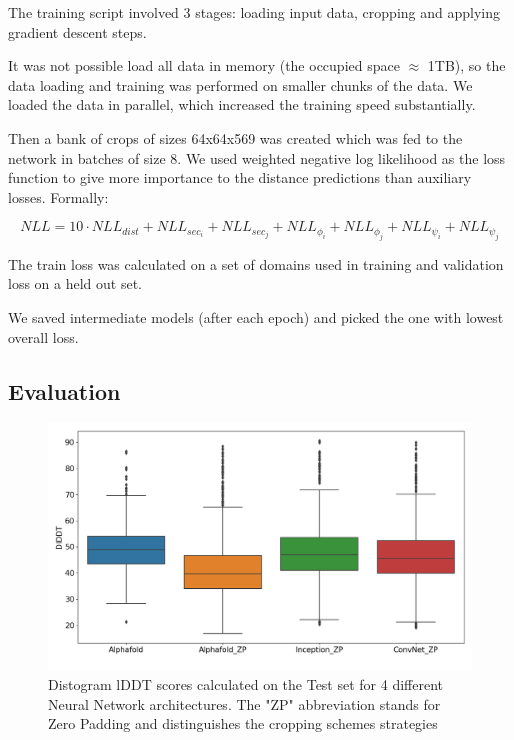 The training script involved 3 stages: loading input data, cropping and applying gradient descent steps.

It was not possible load all data in memory (the occupied space $\approx$ 1TB), so the data loading and training was performed on smaller chunks of the data. We loaded the data in parallel, which increased the training speed substantially.

Then a bank of crops of sizes 64x64x569 was created which was fed to the network in batches of size 8. We used weighted negative log likelihood as the loss function to give more importance to the distance predictions than auxiliary losses. Formally:

\begin{equation}
    NLL = 10 \cdot NLL_{dist} + NLL_{sec_i} + NLL_{sec_j} + NLL_{\phi_i} + NLL_{\phi_j} + NLL_{\psi_i} + NLL_{\psi_j}
    \label{eq:NLLloss}
\end{equation}

The train loss was calculated on a set of domains used in training and validation loss on a held out set. 

We saved intermediate models (after each epoch) and picked the one with lowest overall loss. 

\subsection{Evaluation}

\begin{figure}
    \centering
    \includegraphics[width=\linewidth]{imgs_tomas/models_lddt_nice.png}
    \caption{Distogram lDDT scores calculated on the Test set for 4 different Neural Network architectures. The "ZP" abbreviation stands for Zero Padding and distinguishes the cropping schemes strategies}
    \label{fig:models_lddt}
\end{figure}

